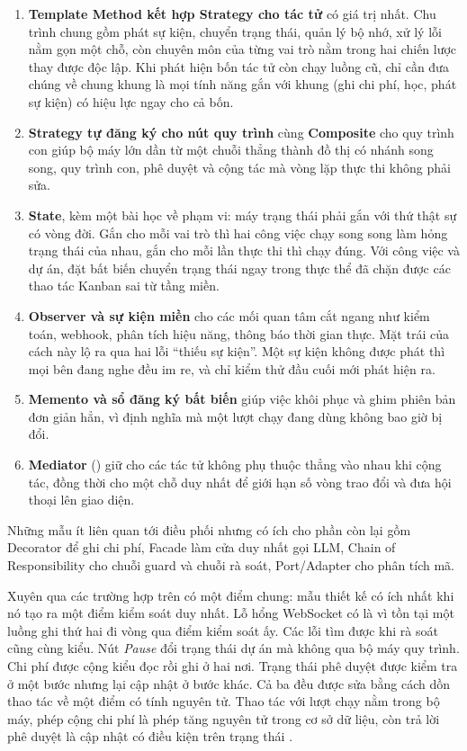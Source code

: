 \begin{enumerate}
\item \textbf{Template Method kết hợp Strategy cho tác tử} có giá trị nhất. Chu trình chung gồm phát sự kiện, chuyển trạng thái, quản lý bộ nhớ, xử lý lỗi nằm gọn một chỗ, còn chuyên môn của từng vai trò nằm trong hai chiến lược thay được độc lập. Khi phát hiện bốn tác tử còn chạy luồng cũ, chỉ cần đưa chúng về chung khung là mọi tính năng gắn với khung (ghi chi phí, học, phát sự kiện) có hiệu lực ngay cho cả bốn.
\item \textbf{Strategy tự đăng ký cho nút quy trình} cùng \textbf{Composite} cho quy trình con giúp bộ máy lớn dần từ một chuỗi thẳng thành đồ thị có nhánh song song, quy trình con, phê duyệt và cộng tác mà vòng lặp thực thi không phải sửa.
\item \textbf{State}, kèm một bài học về phạm vi: máy trạng thái phải gắn với thứ thật sự có vòng đời. Gắn cho mỗi vai trò thì hai công việc chạy song song làm hỏng trạng thái của nhau, gắn cho mỗi lần thực thi thì chạy đúng. Với công việc và dự án, đặt bất biến chuyển trạng thái ngay trong thực thể đã chặn được các thao tác Kanban sai từ tầng miền.
\item \textbf{Observer và sự kiện miền} cho các mối quan tâm cắt ngang như kiểm toán, webhook, phân tích hiệu năng, thông báo thời gian thực. Mặt trái của cách này lộ ra qua hai lỗi ``thiếu sự kiện''. Một sự kiện không được phát thì mọi bên đang nghe đều im re, và chỉ kiểm thử đầu cuối mới phát hiện ra.
\item \textbf{Memento và sổ đăng ký bất biến} giúp việc khôi phục và ghim phiên bản đơn giản hẳn, vì định nghĩa mà một lượt chạy đang dùng không bao giờ bị đổi.
\item \textbf{Mediator} () giữ cho các tác tử không phụ thuộc thẳng vào nhau khi cộng tác, đồng thời cho một chỗ duy nhất để giới hạn số vòng trao đổi và đưa hội thoại lên giao diện.
\end{enumerate}

Những mẫu ít liên quan tới điều phối nhưng có ích cho phần còn lại gồm Decorator để ghi chi phí, Facade làm cửa duy nhất gọi LLM, Chain of Responsibility cho chuỗi guard và chuỗi rà soát, Port/Adapter cho phân tích mã.

Xuyên qua các trường hợp trên có một điểm chung: mẫu thiết kế có ích nhất khi nó tạo ra một điểm kiểm soát duy nhất. Lỗ hổng WebSocket có là vì tồn tại một luồng ghi thứ hai đi vòng qua điểm kiểm soát ấy. Các lỗi tìm được khi rà soát cũng cùng kiểu. Nút \textit{Pause} đổi trạng thái dự án mà không qua bộ máy quy trình. Chi phí được cộng kiểu đọc rồi ghi ở hai nơi. Trạng thái phê duyệt được kiểm tra ở một bước nhưng lại cập nhật ở bước khác. Cả ba đều được sửa bằng cách dồn thao tác về một điểm có tính nguyên tử. Thao tác với lượt chạy nằm trong bộ máy, phép cộng chi phí là phép tăng nguyên tử trong cơ sở dữ liệu, còn trả lời phê duyệt là cập nhật có điều kiện trên trạng thái .


